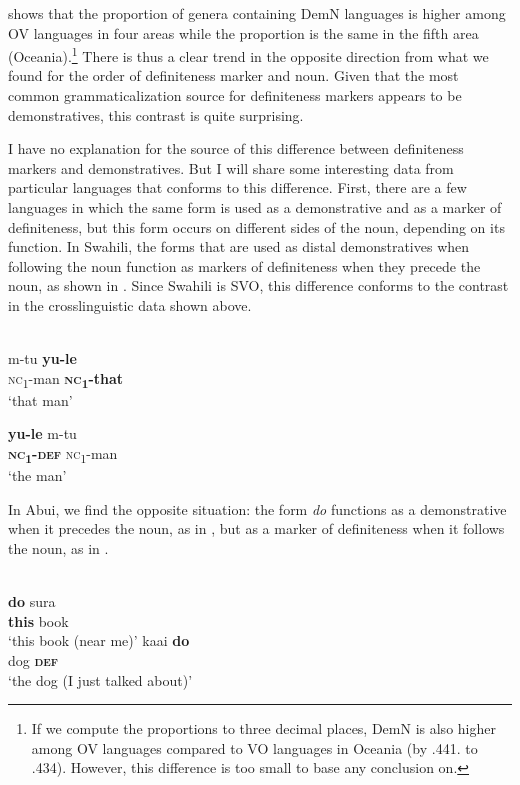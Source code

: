 \documentclass[output=paper]{langsci/langscibook}
\begin{document}
 shows that the proportion of genera containing DemN languages is higher among OV languages in four areas while the proportion is the same in the fifth area (Oceania).\footnote{If we compute the proportions to three decimal places, DemN is also higher among OV languages compared to VO languages in Oceania (by .441. to .434). However, this difference is too small to base any conclusion on.} There is thus a clear trend in the opposite direction from what we found for the order of definiteness marker and noun. Given that the most common grammaticalization source for definiteness markers appears to be demonstratives, this contrast is quite surprising.

I have no explanation for the source of this difference between definiteness markers and demonstratives. But I will share some interesting data from particular languages that conforms to this difference. First, there are a few languages in which the same form is used as a demonstrative and as a marker of definiteness, but this form occurs on different sides of the noun, depending on its function. In Swahili, the forms that are used as distal demonstratives when following the noun function as markers of definiteness when they precede the noun, as shown in . Since Swahili is SVO, this difference conforms to the contrast in the crosslinguistic data shown above.

\ea\label{ex:dryer:37}
\\
  \ea \gll  m-tu  \textbf{yu-le}\\
	  \textsc{nc}\textsubscript{1}{}-man  \textbf{\textsc{nc}}\textbf{\textsubscript{1}}\textbf{{}-that}\\
  \glt     ‘that man’

  \ex
  \gll    \textbf{yu-le}  m-tu\\
	  \textbf{\textsc{nc}}\textbf{\textsubscript{1}}\textbf{{}-}\textbf{\textsc{def}}  \textsc{nc}\textsubscript{1}{}-man\\
  \glt     ‘the man’
  \z
\z

In Abui, we find the opposite situation: the form \textit{do} functions as a demonstrative when it precedes the noun, as in , but as a marker of definiteness when it follows the noun, as in .

\ea\label{ex:dryer:38}
\\
\ea\label{ex:dryer:38a}
\gll     \textbf{do}  sura  \\  
         \textbf{this}  book\\    
\glt     ‘this book (near me)’  
\ex \label{ex:dryer:38b}
\gll kaai  \textbf{do}\\
    dog  \textbf{\textsc{def}}\\
  ‘the dog (I just talked about)’
\z
\z
\end{document}
